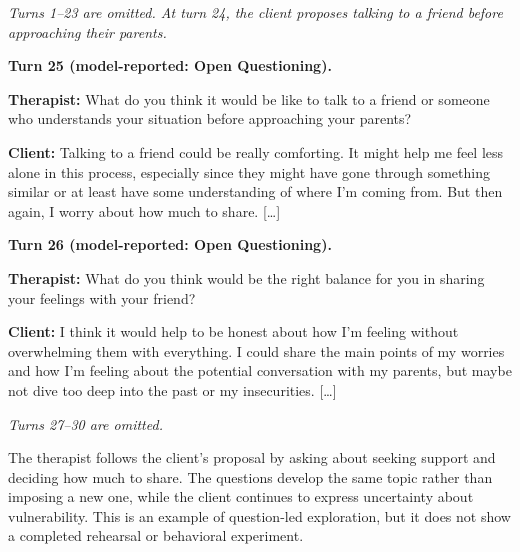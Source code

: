 \begin{tcolorbox}[breakable,colback=gray!5,colframe=gray!45,
    boxrule=0.5pt,arc=2mm,left=3mm,right=3mm,top=2mm,bottom=2mm,
    title={SFT+GRPO(D2): question-led exploration of support} ,colbacktitle=gray!15,coltitle=black]
\small\linespread{1.15}\selectfont
\textit{Turns 1--23 are omitted. At turn 24, the client proposes talking to a friend before approaching their parents.}\par\medskip
\textbf{Turn 25 (model-reported: Open Questioning).}\par
\textbf{Therapist:} What do you think it would be like to talk to a friend or someone who understands your situation before approaching your parents?\par
\textbf{Client:} Talking to a friend could be really comforting. It might help me feel less alone in this process, especially since they might have gone through something similar or at least have some understanding of where I’m coming from. But then again, I worry about how much to share. [\ldots]\par\medskip\textbf{Turn 26 (model-reported: Open Questioning).}\par
\textbf{Therapist:} What do you think would be the right balance for you in sharing your feelings with your friend?\par
\textbf{Client:} I think it would help to be honest about how I’m feeling without overwhelming them with everything. I could share the main points of my worries and how I’m feeling about the potential conversation with my parents, but maybe not dive too deep into the past or my insecurities. [\ldots]\par\medskip\textit{Turns 27--30 are omitted.}
\end{tcolorbox}

The therapist follows the client's proposal by asking about seeking support and deciding how much to share. The questions develop the same topic rather than imposing a new one, while the client continues to express uncertainty about vulnerability. This is an example of question-led exploration, but it does not show a completed rehearsal or behavioral experiment.

